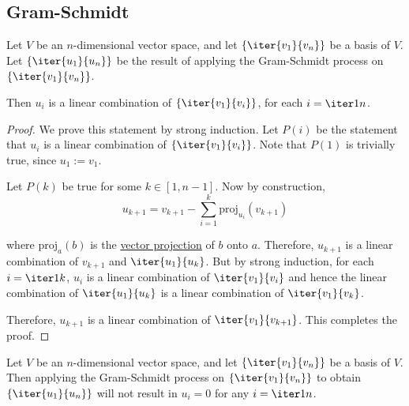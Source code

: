 \subsection{Gram-Schmidt}\label{cd74649}

\label{eead63c}

Let $V$ be an $n$-dimensional vector space, and let $\{\iter{v_1}{v_n}\}$ be a
basis of $V$. Let $\{\iter{u_1}{u_n}\}$ be the result of applying the
Gram-Schmidt process on $\{\iter{v_1}{v_n}\}$.

Then $u_i$ is a linear combination of $\{\iter{v_1}{v_i}\}$, for each
$i=\iter1n$.

\begin{proof}
  \def\proj{\mathrm{proj}}

  We prove this statement by strong induction. Let $P(i)$ be the statement that
  $u_i$ is a linear combination of $\{\iter{v_1}{v_i}\}$. Note that $P(1)$ is
  trivially true, since $u_1:=v_1$.

  Let $P(k)$ be true for some $k\in[1,n-1]$. Now by construction,
  $$
    u_{k+1}=v_{k+1}-\sum_{i=1}^k\proj_{u_i}(v_{k+1})
  $$

  where $\proj_a(b)$ is the \href{fc332ef}{vector projection} of $b$ onto $a$.
  Therefore, $u_{k+1}$ is a linear combination of $v_{k+1}$ and
  $\iter{u_1}{u_k}$. But by strong induction, for each $i=\iter1k$, $u_i$ is a
  linear combination of $\iter{v_1}{v_i}$ and hence the linear combination of
  $\iter{u_1}{u_k}$ is a linear combination of $\iter{v_1}{v_k}$.

  Therefore, $u_{k+1}$ is a linear combination of $\iter{v_1}{v_{k+1}}$. This
  completes the proof.
\end{proof}

\label{c4f05ae}

Let $V$ be an $n$-dimensional vector space, and let $\{\iter{v_1}{v_n}\}$ be a
basis of $V$. Then applying the Gram-Schmidt process on $\{\iter{v_1}{v_n}\}$
to obtain $\{\iter{u_1}{u_n}\}$ will not result in $u_i=0$ for any $i=\iter1n$.

